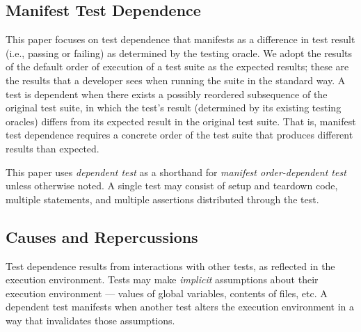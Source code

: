 \subsection{Manifest Test Dependence}

This paper focuses on test
dependence that manifests as a
difference in test result (i.e., passing or failing) as determined by the testing oracle.
We adopt the results of the default
order of execution of a test suite as the
expected results; these are the results that a developer sees when running
the suite in the standard way. A test is dependent when there exists a possibly
reordered subsequence of the original test suite, in which
the test's result (determined by its existing testing
oracles) differs from its expected result in the
original test suite.
%
That is, manifest test dependence
requires a concrete order of the test suite that
produces {different} results than expected.  
%
%



This paper uses \textit{dependent test} as a shorthand for
\textit{manifest order-dependent test}
unless otherwise noted.
A single test may consist of setup and teardown
code, multiple statements, and multiple assertions
distributed through the test.




\subsection{Causes and Repercussions}
\label{sec:intro-repercussions}


Test dependence results from interactions with other tests,
as reflected in the execution environment.
Tests may make \textit{implicit} assumptions about their
execution environment --- values of global variables,
contents of files, etc. A dependent test
manifests when another test alters the execution
environment in a way that invalidates those assumptions.

